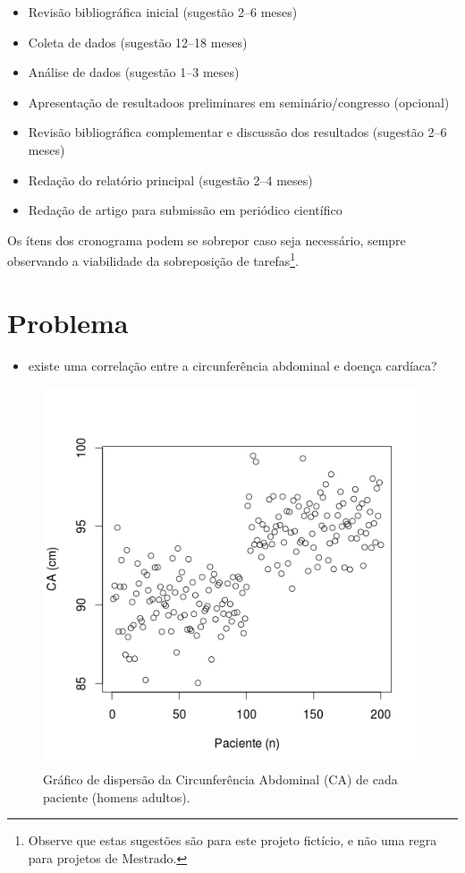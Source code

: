 \documentclass[a4paper]{article}
\begin{document}
\begin{itemize}
\item Revisão bibliográfica inicial (sugestão 2--6 meses)
\item Coleta de dados (sugestão 12--18 meses)
\item Análise de dados (sugestão 1--3 meses)
\item Apresentação de resultadoos preliminares em seminário/congresso
  (opcional)
\item Revisão bibliográfica complementar e discussão dos resultados
  (sugestão 2--6 meses)
\item Redação do relatório principal (sugestão 2--4 meses)
\item Redação de artigo para submissão em periódico científico
\end{itemize}

Os ítens dos cronograma podem se sobrepor caso seja necessário, sempre
observando a viabilidade da sobreposição de tarefas\footnote{Observe
  que estas sugestões são para este projeto fictício, e não uma regra
  para projetos de Mestrado.}.

\section{Problema}

\begin{itemize}
\item existe uma correlação entre a circunferência abdominal e doença
  cardíaca?
\end{itemize}

\begin{figure}[h]
  \centering
  \includegraphics[width=.5\textwidth]{dispersao}
  \caption{Gráfico de dispersão da Circunferência Abdominal (CA) de
    cada paciente (homens adultos).}
  \label{fig:dispersao}
\end{figure}
\end{document}
